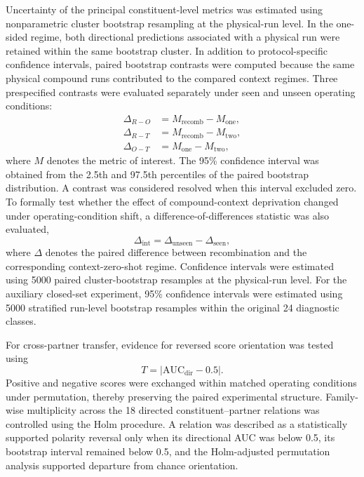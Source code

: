 Uncertainty of the principal constituent-level metrics was estimated using
nonparametric cluster bootstrap resampling at the physical-run level. In
the one-sided regime, both directional predictions associated with a
physical run were retained within the same bootstrap cluster. In addition
to protocol-specific confidence intervals, paired bootstrap contrasts were
computed because the same physical compound runs contributed to the
compared context regimes. Three prespecified contrasts were evaluated
separately under seen and unseen operating conditions:
\begin{align}
\Delta_{R-O} &= M_{\mathrm{recomb}} - M_{\mathrm{one}},\\
\Delta_{R-T} &= M_{\mathrm{recomb}} - M_{\mathrm{two}},\\
\Delta_{O-T} &= M_{\mathrm{one}} - M_{\mathrm{two}},
\end{align}
where $M$ denotes the metric of interest. The 95\% confidence interval was
obtained from the 2.5th and 97.5th percentiles of the paired bootstrap
distribution. A contrast was considered resolved when this interval
excluded zero. To formally test whether the effect of compound-context
deprivation changed under operating-condition shift, a
difference-of-differences statistic was also evaluated,
\begin{equation}
\Delta_{\mathrm{int}} = \Delta_{\mathrm{unseen}} - \Delta_{\mathrm{seen}},
\label{eq:interaction}
\end{equation}
where $\Delta$ denotes the paired difference between recombination and the
corresponding context-zero-shot regime. Confidence intervals were estimated
using 5000 paired cluster-bootstrap resamples at the physical-run level.
For the auxiliary closed-set experiment, 95\% confidence intervals were
estimated using 5000 stratified run-level bootstrap resamples within the
original 24 diagnostic classes.

For cross-partner transfer, evidence for reversed score orientation was
tested using
\begin{equation}
T = \left|\mathrm{AUC}_{\mathrm{dir}} - 0.5\right|.
\label{eq:polarity}
\end{equation}
Positive and negative scores were exchanged within matched operating
conditions under permutation, thereby preserving the paired experimental
structure. Family-wise multiplicity across the 18 directed
constituent--partner relations was controlled using the Holm procedure. A
relation was described as a statistically supported polarity reversal only
when its directional AUC was below 0.5, its bootstrap interval remained
below 0.5, and the Holm-adjusted permutation analysis supported departure
from chance orientation.
